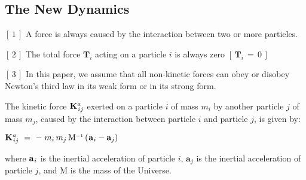 \documentclass[10pt]{article}
\begin{document}
\vspace{+1.20em}

\par {\centering\subsection*{The New Dynamics}}

\par \bigskip\smallskip \noindent $[\,1\,]$ A force is always caused by the interaction between two or more particles.

\par \bigskip \noindent $[\,2\,]$ The total force ${\mathbf{T}}_i$ acting on a particle $i$ is always zero $[ \, {\mathbf{T}}_i \,=\, 0 \, ]$

\par \bigskip \noindent $[\,3\,]$ In this paper, we assume that all non-kinetic forces can obey or disobey Newton's third law in its weak form or in its strong form.

\newpage

\par {}

\par \bigskip\smallskip \noindent The kinetic force ${\mathbf{K}}^{a}_{\hspace{+0.060em}ij}$ exerted on a particle $i$ of mass $m_i$ by another particle $j$ of mass $m_j$, caused by the interaction between particle $i$ and particle $j$, is given by:

\par \bigskip ${\mathbf{K}}^{a}_{\hspace{+0.060em}ij} ~=~ - \; m_i \, m_j \, {\mathrm{M}}^{\scriptscriptstyle -1} \, (\hspace{+0.045em}{\mathbf{a}}_{\hspace{+0.045em}i} - {\mathbf{a}}_{j})$

\par \bigskip \noindent where ${\mathbf{a}}_{\hspace{+0.045em}i}$ is the inertial acceleration of particle $i$, ${\mathbf{a}}_{j}$ is the inertial acceleration of particle $j$, and ${\mathrm{M}}$ is the mass of the Universe.
\end{document}
